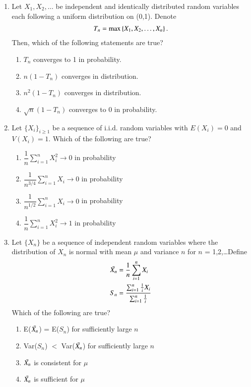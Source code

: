 \renewcommand{\theequation}{\theenumi}
\renewcommand{\thefigure}{\theenumi}
\renewcommand{\thetable}{\theenumi}
\begin{enumerate}[label=\thesection.\arabic*.,ref=\thesection.\theenumi]
%
\item 
Let $X_{1},X_{2},\dots$ be independent and identically distributed random variables each following a uniform distribution on (0,1). Denote 
\begin{align}
T_{n}=\max\left\{ X_{1},X_{2},\dots,X_{n}\right\}. 
\end{align}
Then, which of the following statements are true?
\begin{enumerate}
    \item $T_{n}$ converges to 1 in probability.
    \item $n(1-T_{n})$ converges in distribution.
    \item $n^{2}(1-T_{n})$ converges in distribution.
    \item $\sqrt{n}(1-T_{n})$ converges to 0 in probability.
\end{enumerate}
%
\solution

%
\item Let $\{X_i\}_{i \geq 1}$ be a sequence of i.i.d. random variables with $E(X_i)=0$ and $V(X_i)=1$. Which of the following are true?
%
\begin{enumerate}
    \setlength{\itemsep}{2pt}
    \item $\dfrac{1}{n} \sum_{i=1}^n X_i^2 \to 0$ in probability 
    \item $\dfrac{1}{n^{3/4}} \sum_{i=1}^n X_i \to 0$ in probability 
    \item $\dfrac{1}{n^{1/2}} \sum_{i=1}^n X_i \to 0$ in probability 
    \item $\dfrac{1}{n} \sum_{i=1}^n X_i^2 \to 1$ in probability
\end{enumerate}
%
\solution

%
\item Let $\{X_{n}\}$ be a sequence of independent random variables where the distribution of $X_{n}$ is normal with mean $\mu$ and variance $n$ for $n$ = 1,2,\dots Define
\begin{align}
    \Bar{X_{n}}&=\frac{1}{n}\sum_{i=1}^{n}X_{i}\\ S_{n}&=\frac{\sum_{i=1}^{n}\frac{1}{i}X_{i}}{\sum_{i=1}^{n}\frac{1}{i}}
\end{align}
Which of the following are true?
\begin{enumerate}
    \item E($\Bar{X_{n}}$) = E($S_{n}$) for sufficiently large $n$
    \label{conv/3/option 1}
    \item Var($S_{n}$) $<$ Var($\Bar{X_{n}}$) for sufficiently large $n$
    \label{conv/3/option 2}
    \item $\Bar{X_{n}}$ is consistent for $\mu$
    \label{conv/3/option 3}
    \item $\Bar{X_{n}}$ is sufficient for $\mu$
    \label{conv/3/option 4}
\end{enumerate}
%
\solution



\end{enumerate}
